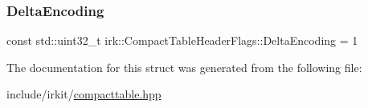 \subsubsection{\texorpdfstring{Delta\+Encoding}{DeltaEncoding}}
{\footnotesize\ttfamily const std\+::uint32\+\_\+t irk\+::\+Compact\+Table\+Header\+Flags\+::\+Delta\+Encoding = 1\hspace{0.3cm}{\ttfamily [static]}}



The documentation for this struct was generated from the following file\+:\begin{DoxyCompactItemize}
\item 
include/irkit/\mbox{\hyperlink{compacttable_8hpp}{compacttable.\+hpp}}\end{DoxyCompactItemize}
